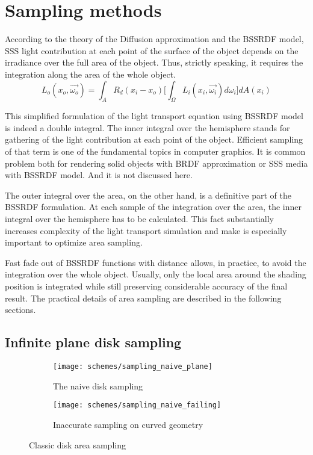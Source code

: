 \section{Sampling methods}
\label{sampling_methods}

According to the theory of the Diffusion approximation and the BSSRDF model, SSS light
contribution at each point of the surface of the object depends on the irradiance over the full area
of the object. Thus, strictly speaking, it requires the integration along the area of the whole
object.
\[
L_o(x_o, \vec{\omega_o})= \int_{A} R_d(x_i-x_o) \Bigg[ \int_{\Omega}
L_i(x_i,\vec{\omega_i})d\omega_i \Bigg] dA(x_i)
\]

This simplified formulation of the light transport equation using BSSRDF model is indeed a double
integral.
The inner integral over the hemisphere stands for gathering of the light contribution at each point
of the object. Efficient sampling of that term is one of the fundamental topics in computer
graphics. It is common problem both for rendering solid objects with BRDF approximation or SSS media
with BSSRDF model. And it is not discussed here.

The outer integral over the area, on the other hand, is a definitive part of the
BSSRDF formulation. At each sample of the integration over the area, the inner
integral over the hemisphere has to be calculated. This fact substantially increases complexity of
the light transport simulation and make is especially important to optimize area
sampling.

Fast fade out of BSSRDF functions with distance allows, in practice, to avoid the integration over
the whole object. Usually, only the local area around the shading position is integrated while still
preserving considerable accuracy of the final result. The practical details of area sampling are
described in the following sections.

\subsection{Infinite plane disk sampling}
\label{subsection:sampling_simple_disk}
\begin{figure}[h]
    \centering
    \begin{subfigure}{0.45\textwidth}
        \texttt{[image: schemes/sampling\_naive\_plane]}
        \caption{The naive disk sampling}
        \label{fig:sampling_naive}
    \end{subfigure}
    \quad
    \begin{subfigure}{0.45\textwidth}
        \texttt{[image: schemes/sampling\_naive\_failing]}
        \caption{Inaccurate sampling on curved geometry}
        \label{fig:sampling_naive_fails}
    \end{subfigure}
    \caption{Classic disk area sampling}
\end{figure}

